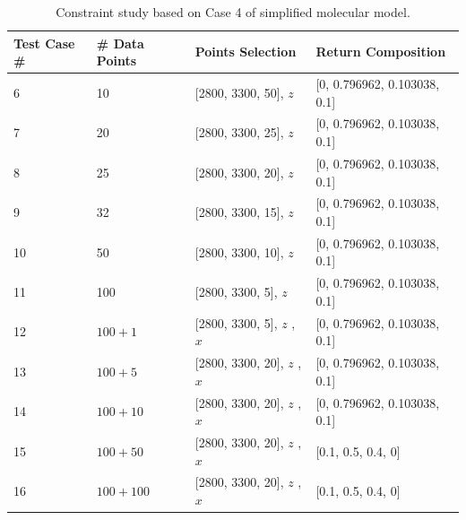 \begin{table}[ht!] \small
\begin{center}
{\def\arraystretch{1.5}
\begin{tabular}{| p{1cm} | p{3cm} | p{5cm} | l |} \hline
	Test Case \# & \# Data Points & Points Selection & Return Composition \\ \hline
	6 & 10 & [2800, 3300, 50], $z$ & [0, 0.796962, 0.103038, 0.1] \\ \hline
	7 & 20 & [2800, 3300, 25], $z$ & [0, 0.796962, 0.103038, 0.1] \\ \hline
	8 & 25 & [2800, 3300, 20], $z$ & [0, 0.796962, 0.103038, 0.1] \\ \hline
	9 & 32 & [2800, 3300, 15], $z$ & [0, 0.796962, 0.103038, 0.1] \\ \hline
	10 & 50 & [2800, 3300, 10], $z$ & [0, 0.796962, 0.103038, 0.1] \\ \hline
	11 & 100 & [2800, 3300, 5], $z$ & [0, 0.796962, 0.103038, 0.1] \\ \hline
	12 & $100 + 1$ & [2800, 3300, 5], $z$ \newline [2800, 3300, 500], $x$ & [0, 0.796962, 0.103038, 0.1] \\ \hline
	13 & $100 + 5$ & [2800, 3300, 20], $z$ \newline [2800, 3300, 100], $x$ & [0, 0.796962, 0.103038, 0.1] \\ \hline
	14 & $100 + 10$ & [2800, 3300, 20], $z$ \newline  [2800, 3300, 50], $x$ & [0, 0.796962, 0.103038, 0.1] \\ \hline
	15 & $100 + 50$ & [2800, 3300, 20], $z$ \newline  [2800, 3300, 10], $x$ & [0.1, 0.5, 0.4, 0] \\ \hline
	16 & $100 + 100$ & [2800, 3300, 20], $z$ \newline  [2800, 3300, 5], $x$ & [0.1, 0.5, 0.4, 0] \\ 
	\hline
\end{tabular} 
}
\end{center}
\caption{Constraint study based on Case 4 of simplified molecular model.} \label{tab:7.3}
\end{table}

